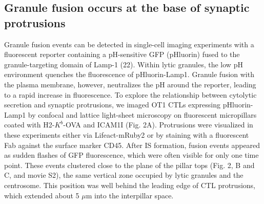 \subsection{Granule fusion occurs at the base of synaptic protrusions}
Granule fusion events can be detected in single-cell imaging experiments with a fluorescent reporter containing a pH-sensitive GFP (pHluorin) fused to the granule-targeting domain of Lamp-1 (22). Within lytic granules, the low pH environment quenches the fluorescence of pHluorin-Lamp1. Granule fusion with the plasma membrane, however, neutralizes the pH around the reporter, leading to a rapid increase in fluorescence. To explore the relationship between cytolytic secretion and synaptic protrusions, we imaged OT1 CTLs expressing pHluorin-Lamp1 by confocal and lattice  light-sheet
microscopy on fluorescent micropillars coated with H2-$K^{b}$-OVA and ICAM1I (Fig. 2A). Protrusions were visualized in these experiments either via Lifeact-mRuby2 or by staining with a fluorescent Fab against the surface marker CD45. After IS formation, fusion events appeared as sudden flashes of GFP fluorescence, which were often visible for only one time point. These events clustered close to the plane of the pillar tops (Fig. 2, B and C, and movie S2), the same vertical zone occupied by lytic granules and the centrosome. This position was well behind the leading edge of CTL protrusions, which extended about 5 $\mu$m into the interpillar space.


